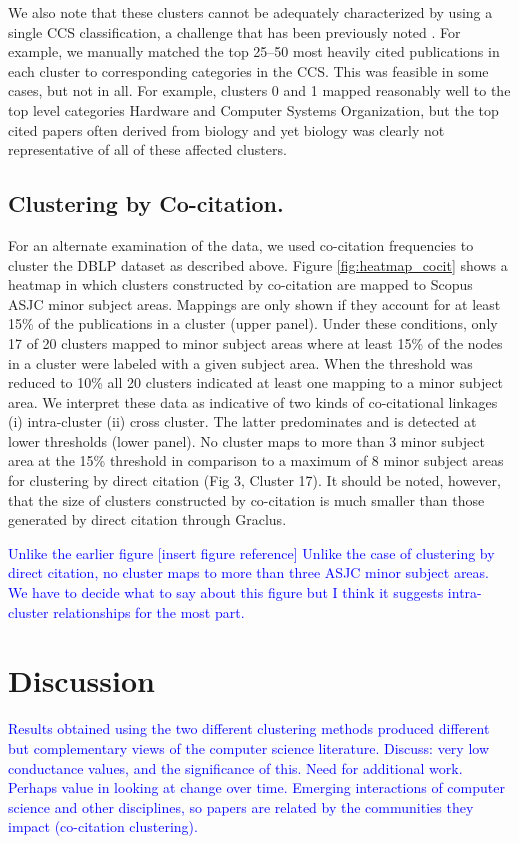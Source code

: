 We also note that these clusters cannot be adequately characterized by using a single CCS classification, a challenge that has been previously noted \cite{waltman_new_2012}.
For example, we
manually matched the top 25--50 most heavily cited publications in each cluster to corresponding categories in the CCS. This was feasible in some cases, but not in all. For example, clusters 0 and 1 mapped reasonably well to the top level categories Hardware and Computer Systems Organization,  but 
the top cited papers often derived from biology and yet biology was clearly not  representative of all of these affected clusters.


\subsection{Clustering by Co-citation.} For an alternate examination of the data, we used co-citation frequencies to cluster the DBLP dataset as described above. Figure \ref{fig:heatmap_cocit} shows a heatmap in which clusters constructed by co-citation are mapped to Scopus ASJC minor subject areas. Mappings are only shown if they account for at least 15\% of the publications in a cluster (upper panel). Under these conditions, only 17 of 20 clusters mapped to minor subject areas where at least 15\% of the nodes in a cluster were labeled with a given subject area. When the threshold was reduced to 10\% all 20 clusters indicated at least one mapping to a minor subject area. We interpret these data as indicative of two kinds of co-citational linkages (i) intra-cluster (ii) cross cluster. The latter predominates and is detected at lower thresholds (lower panel). No cluster maps to more than 3 minor subject area at the 15\% threshold in comparison to a maximum of 8 minor subject areas for clustering by direct citation (Fig 3, Cluster 17). It should be noted, however, that the size of clusters constructed by co-citation is much smaller than those generated by direct citation through Graclus. 

\textcolor{blue}{
Unlike the earlier figure [insert figure reference] Unlike the case of clustering by direct citation, no cluster maps to more than three ASJC minor subject areas. We have to decide what to say about this figure but I think it suggests intra-cluster relationships for the most part. }


\section{Discussion}
\textcolor{blue}{
Results obtained using the two different clustering methods produced different but complementary views of the computer
science literature.
Discuss: very low conductance values, and the significance of this. 
Need for additional work. 
Perhaps value in looking at change over time.
Emerging interactions of computer science and other disciplines, 
so papers are related by the communities they impact (co-citation clustering).
 }

